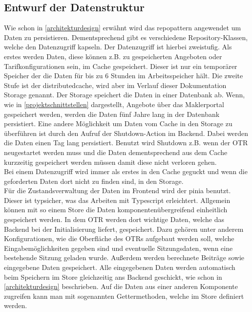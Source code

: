\subsection{Entwurf der Datenstruktur}
\label{datenmodell}
Wie schon in \ref{architekturdesign}  erwähnt wird das \gls{repopattern} angewendet um Daten zu persistieren. Dementsprechend gibt es verschiedene Repository-Klassen, welche den Datenzugriff kapseln. Der Datenzugriff ist hierbei zweistufig. Als erstes werden Daten, diese können z.B. zu gespeicherten Angeboten oder Tarifkonfigurationen sein, im Cache gespeichert. Dieser ist nur ein temporärer Speicher der die Daten für bis zu 6 Stunden im Arbeitsspeicher hält. Die zweite Stufe ist der \gls{distributedcache}, wird aber im Verlauf dieser Dokumentation Storage genannt. Der Storage speichert die Daten in einer Datenbank ab.
Wenn, wie in \ref{projektschnittstellen}   dargestellt, Angebote über das Maklerportal gespeichert werden, werden die Daten fünf Jahre lang in der Datenbank persistiert. Eine andere Möglichkeit um Daten vom Cache in den Storage zu überführen ist durch den Aufruf der Shutdown-Action im Backend. Dabei werden die Daten einen Tag lang persistiert. Benutzt wird Shutdown z.B. wenn der \ac{OTR} neugestartet werden muss und die Daten dementsprechend aus dem Cache kurzzeitig gespeichert werden müssen damit diese nicht verloren gehen.\\
Bei einem Datenzugriff wird immer als erstes in den Cache geguckt und wenn die geforderten Daten dort nicht zu finden sind, in den Storage.\\
Für die Zustandsverwaltung der Daten im Frontend wird der \gls{pinia} benutzt. Dieser ist typsicher, was das Arbeiten mit Typescript erleichtert. Allgemein können mit so einem Store die Daten komponentenübergreifend einheitlich gespeichert werden. In dem \ac{OTR} werden dort wichtige Daten, welche das Backend bei der Initialisierung liefert, gespeichert. Dazu gehören unter anderem Konfigurationen, wie die Oberfläche des \ac{OTR}s aufgebaut werden soll, welche Eingabemöglichkeiten gegeben sind und eventuelle Sitzungsdaten, wenn eine bestehende Sitzung geladen wurde. Außerdem werden berechnete Beiträge sowie eingegebene Daten gespeichert. Alle eingegebenen Daten werden automatisch beim Speichern im Store gleichzeitig ans Backend geschickt, wie schon in \ref{architekturdesign}  beschrieben. Auf die Daten aus einer anderen Komponente zugreifen kann man mit sogenannten Gettermethoden, welche im Store definiert werden.
